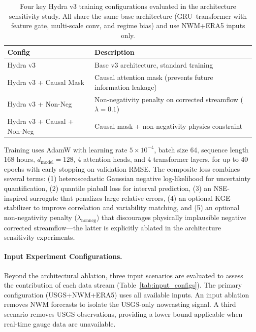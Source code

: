 \documentclass[draft]{agujournal2019}
\begin{document}
\begin{table}
    \centering
    \caption{Four key Hydra v3 training configurations evaluated in the architecture sensitivity study. All share the same base architecture (GRU--transformer with feature gate, multi-scale conv, and regime bias) and use NWM+ERA5 inputs only.}
    \begin{tabular}{lp{8cm}}
        \toprule
        \textbf{Config} & \textbf{Description} \\
        \midrule
        Hydra v3 & Base v3 architecture, standard training \\
        Hydra v3 + Causal Mask & Causal attention mask (prevents future information leakage) \\
        Hydra v3 + Non-Neg & Non-negativity penalty on corrected streamflow ($\lambda = 0.1$) \\
        Hydra v3 + Causal + Non-Neg & Causal mask + non-negativity physics constraint \\
        \bottomrule
    \end{tabular}
    \label{tab:configs}
\end{table}

Training uses AdamW with learning rate $5 \times 10^{-4}$, batch size 64, sequence length 168 hours, $d_{\text{model}} = 128$, 4 attention heads, and 4 transformer layers, for up to 40 epochs with early stopping on validation RMSE. The composite loss combines several terms: (1) heteroscedastic Gaussian negative log-likelihood for uncertainty quantification, (2) quantile pinball loss for interval prediction, (3) an NSE-inspired surrogate that penalizes large relative errors, (4) an optional KGE stabilizer to improve correlation and variability matching, and (5) an optional non-negativity penalty ($\lambda_{\text{nonneg}}$) that discourages physically implausible negative corrected streamflow---the latter is explicitly ablated in the architecture sensitivity experiments.

\paragraph{Input Experiment Configurations.} Beyond the architectural ablation, three input scenarios are evaluated to assess the contribution of each data stream (Table~\ref{tab:input_configs}). The primary configuration (USGS+NWM+ERA5) uses all available inputs. An input ablation removes NWM forecasts to isolate the USGS-only nowcasting signal. A third scenario removes USGS observations, providing a lower bound applicable when real-time gauge data are unavailable.
\end{document}

